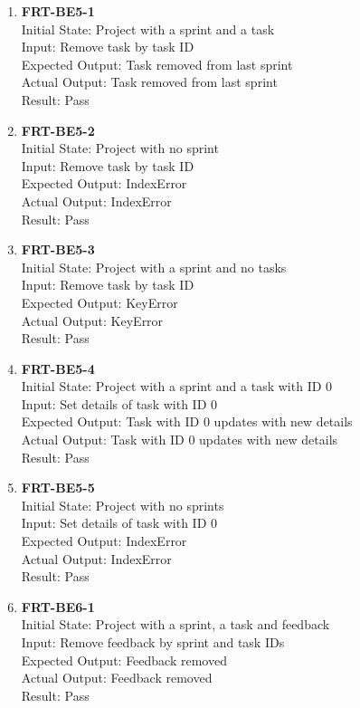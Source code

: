 \documentclass[12pt, titlepage]{article}
\begin{document}
\begin{enumerate}
    \item{\textbf{FRT-BE5-1}}\\
    Initial State: Project with a sprint and a task\\
    Input: Remove task by task ID\\
    Expected Output: Task removed from last sprint\\
    Actual Output: Task removed from last sprint\\
    Result: Pass
    
    \item{\textbf{FRT-BE5-2}}\\
    Initial State: Project with no sprint\\
    Input: Remove task by task ID\\
    Expected Output: IndexError\\
    Actual Output: IndexError\\
    Result: Pass
    
    \item{\textbf{FRT-BE5-3}}\\
    Initial State: Project with a sprint and no tasks\\
    Input: Remove task by task ID\\
    Expected Output: KeyError\\
    Actual Output: KeyError\\
    Result: Pass
    
    \item{\textbf{FRT-BE5-4}}\\
    Initial State: Project with a sprint and a task with ID 0\\
    Input: Set details of task with ID 0\\
    Expected Output: Task with ID 0 updates with new details\\
    Actual Output: Task with ID 0 updates with new details\\
    Result: Pass
    
    \item{\textbf{FRT-BE5-5}}\\
    Initial State: Project with no sprints\\
    Input: Set details of task with ID 0\\
    Expected Output: IndexError\\
    Actual Output: IndexError\\
    Result: Pass
    
    \item{\textbf{FRT-BE6-1}}\\
    Initial State: Project with a sprint, a task and feedback\\
    Input: Remove feedback by sprint and task IDs\\
    Expected Output: Feedback removed\\
    Actual Output: Feedback removed\\
    Result: Pass
    

\end{enumerate}
\end{document}
